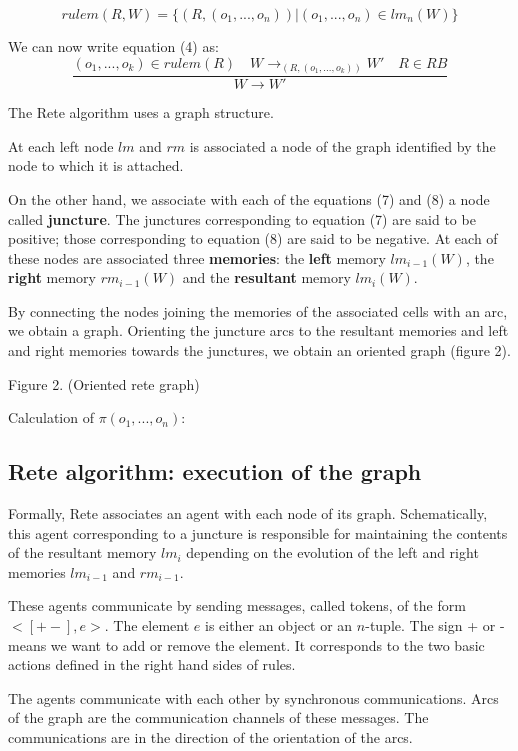 \begin{equation}
rulem(R, W) = \{ (R, (o_1, ..., o_n)) | (o_1, ..., o_n) \in lm_n(W) \}
\end{equation}

We can now write equation (4) as:
\begin{equation}
\frac{(o_1, ..., o_{k}) \in rulem (R) \quad W \rightarrow_{(R, (o_1, ..., o_k))} W' \quad R \in RB }
{W \rightarrow W'}
\end{equation}

The Rete algorithm uses a graph structure.

At each left node $lm$ and $rm$ is associated a node of the graph identified by the node
to which it is attached.

On the other hand, we associate with each of the equations (7) and (8) a node called \textbf{juncture}.
The junctures corresponding to equation (7) are said to be positive; those corresponding to equation (8)
are said to be negative.  At each of these nodes are associated three \textbf{memories}: the \textbf{left} memory
$lm_{i-1} (W)$, the \textbf{right} memory $rm_{i-1} (W)$ and the \textbf{resultant} memory $lm_i (W)$.

By connecting the nodes joining the memories of the associated cells with an arc, we obtain a
graph. Orienting the juncture arcs to the resultant memories and left and right memories
towards the junctures, we obtain an oriented graph (figure 2).

Figure 2. (Oriented rete graph)

Calculation of $\pi(o_1, ..., o_n)$:

\subsection{Rete algorithm: execution of the graph}

Formally, Rete associates an agent with each node of its graph. Schematically,
this agent corresponding to a juncture is responsible for maintaining the contents of the
resultant memory $lm_i$ depending on the evolution of the left and right memories $lm_{i-1}$ and $rm_{i-1}$.

These agents communicate by sending messages, called tokens, of the form
$<[+ -], e>$. The element $e$ is either an object or an $n$-tuple. The sign + or - means
we want to add or remove the element. It corresponds to the two basic actions
defined in the right hand sides of rules.

The agents communicate with each other by synchronous communications. Arcs
of the graph are the communication channels of these messages. The communications
are in the direction of the orientation of the arcs.

